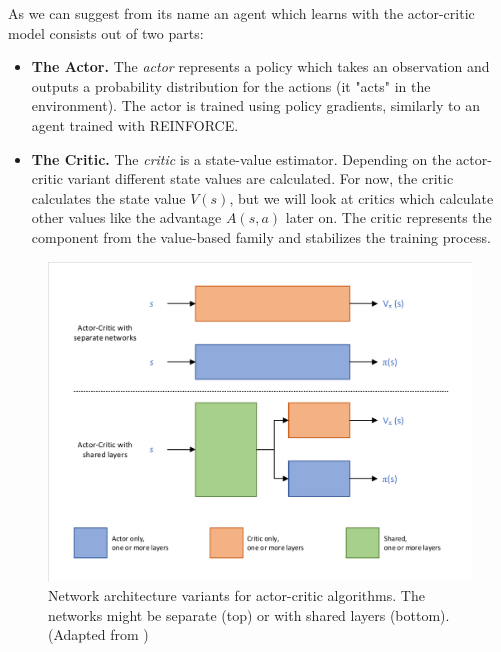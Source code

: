 As we can suggest from its name an agent which learns with the actor-critic model consists out of two parts: 
\begin{itemize}
  \item \textbf{The Actor.} The \textit{actor} represents a policy which takes an observation and outputs a probability distribution for the actions (it "acts" in the environment). The actor is trained using policy gradients, similarly to an agent trained with REINFORCE. 
  \item \textbf{The Critic.} The \textit{critic} is a state-value estimator. Depending on the actor-critic variant different state values are calculated. For now, the critic calculates the state value $V(s)$, but we will look at critics which calculate other values like the advantage $A(s, a)$ later on. The critic represents the component from the value-based family and stabilizes the training process.   
\end{itemize}

\begin{figure}[ht]
  
  \begin{center}
      \includegraphics[clip, trim=10px 10px 10px 10px, width=0.95\columnwidth]{figures/rl/Actor_Critic_Architecture.pdf}
  \end{center}
  
  \caption[Actor-Critic Network Architectures]{Network architecture variants for actor-critic algorithms. The networks might be separate (top) or with shared layers (bottom). (Adapted from \cite{foundations2019graesser})}
  \label{fig:actor_critic_architecture}
\end{figure}

